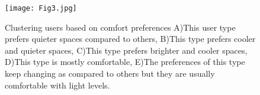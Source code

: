   


\begin{figure}
\begin{center}
\texttt{[image: Fig3.jpg]}
\caption{Clustering users based on comfort preferences A)This user type prefers quieter spaces compared to others, B)This type prefers cooler and quieter spaces, C)This type prefers brighter and cooler spaces, D)This type is mostly comfortable, E)The preferences of this type keep changing as compared to others but they are usually comfortable with light levels.}
\label{fig:clustering}
\end{center}
\end{figure}

